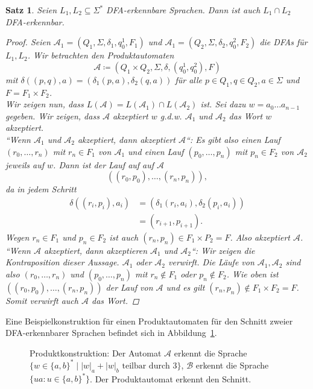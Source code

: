 \documentclass[11pt, a4paper]{article}
\theoremstyle{definition}
\theoremstyle{plain}
\newtheorem{theorem}[definition]{Satz}
\numberwithin{equation}{section}
\begin{document}
\begin{theorem}\label{thm:regular_intersection}
	Seien $L_1, L_2 \subseteq \Sigma^\ast$ DFA-erkennbare Sprachen. Dann ist auch $L_1 \cap L_2$ DFA-erkennbar.
	\begin{proof}
		Seien $\mathcal{A}_1 = (Q_1, \Sigma, \delta_1, q_0^1, F_1)$ und $\mathcal{A}_1 = (Q_2, \Sigma, \delta_2, q_0^2, F_2)$ die DFAs für $L_1, L_2$. Wir betrachten den \textit{Produktautomaten}
		$$
			\mathcal{A} \coloneqq (Q_1 \times Q_2, \Sigma, \delta, (q_0^1, q_0^2), F)
		$$
		mit $\delta((p, q), a) = (\delta_1(p, a), \delta_2(q, a))$ für alle $p \in Q_1, q \in Q_2, a \in \Sigma$ und $F = F_1 \times F_2$.\\
		Wir zeigen nun, dass $L(\mathcal{A}) = L(\mathcal{A}_1) \cap L(\mathcal{A}_2)$ ist.
		Sei dazu $w = a_0 \ldots a_{n-1}$ gegeben. Wir zeigen, dass $\mathcal{A}$ akzeptiert $w$ {g.d.w.} $\mathcal{A}_1$ und $\mathcal{A}_2$ das Wort $w$ akzeptiert.\\
		``Wenn $\mathcal{A}_1$ und $\mathcal{A}_2$ akzeptiert, dann akzeptiert $\mathcal{A}$``:
		Es gibt also einen Lauf $(r_0, \ldots, r_n)$ mit $r_n \in F_1$ von $\mathcal{A}_1$ und einen Lauf $(p_0, \ldots, p_n)$ mit $p_n \in F_2$ von $\mathcal{A}_2$ jeweils auf $w$. Dann ist der Lauf auf auf $\mathcal{A}$
		$$
			((r_0, p_0), \ldots, (r_n, p_n)),
		$$
		da in jedem Schritt 
		\begin{align*}
			\delta((r_i, p_i), a_i) &= (\delta_1(r_i, a_i), \delta_2(p_i, a_i)) \\
			&= (r_{i+1}, p_{i+1}).
		\end{align*}
		Wegen $r_n \in F_1$ und $p_n \in F_2$ ist auch $(r_n, p_n) \in F_1 \times P_2 = F$. Also akzeptiert $\mathcal{A}$.\\
		``Wenn $\mathcal{A}$ akzeptiert, dann akzeptieren $\mathcal{A}_1$ und $\mathcal{A}_2$``:
		Wir zeigen die Kontraposition dieser Aussage. $\mathcal{A}_1$ oder $\mathcal{A}_2$ verwirft. Die Läufe von $\mathcal{A}_1, \mathcal{A}_2$ sind also $(r_0, \ldots, r_n)$ und $(p_0, \ldots, p_n)$ mit $r_n \notin F_1$ oder $p_n \notin F_2$. Wie oben ist $((r_0, p_0), \ldots, (r_n, p_n))$ der Lauf von $\mathcal{A}$ und es gilt $(r_n, p_n) \notin F_1 \times F_2 = F$. Somit verwirft auch $\mathcal{A}$ das Wort.
	\end{proof}
\end{theorem}
Eine Beispielkonstruktion für einen Produktautomaten für den Schnitt zweier DFA-erkennbarer Sprachen befindet sich in Abbildung~\ref{fig:dfa_product}.
\begin{figure}
	\centering
	
	\caption{Produktkonstruktion: Der Automat $\mathcal{A}$ erkennt die Sprache $\{ w \in \{a, b \}^\ast \mid |w|_a + |w|_b \text{ teilbar durch } 3 \}$, $\mathcal{B}$ erkennt die Sprache $\{ ua : u \in \{a, b\}^\ast \}$. Der Produktautomat erkennt den Schnitt.}
	\label{fig:dfa_product}
\end{figure}
\end{document}
